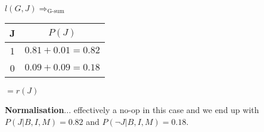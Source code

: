 \documentclass{article}
\begin{document}
\begin{center}
	$l(G,J) \Rightarrow_{\text{G-sum}}$
	\begin{tabular}{ |c|c| }
	 \hline
	 J & $P(J)$ \\
	 \hline
	 1 & $0.81 + 0.01 = 0.82$ \\
	 0 & $0.09 + 0.09 = 0.18$ \\
	 \hline
	\end{tabular}
	$= r(J)$
\end{center}

\textbf{Normalisation}... effectively a no-op in this case and we end up with $P(J | B, I, M) = 0.82$ and $P(\neg J | B, I, M) = 0.18$.
\end{document}
